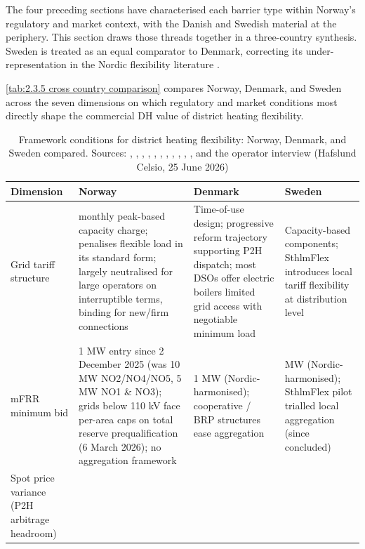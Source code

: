 The four preceding sections have characterised each barrier type within Norway's regulatory and market context, with the Danish and Swedish material at the periphery. This section draws those threads together in a three-country synthesis. Sweden is treated as an equal comparator to Denmark, correcting its under-representation in the Nordic flexibility literature \cite{atabaki_optimising_2026, fernqvist_district_2023}.

\autoref{tab:2.3.5 cross country comparison} compares Norway, Denmark, and Sweden across the seven dimensions on which regulatory and market conditions most directly shape the commercial DH value of district heating flexibility.

\begin{table}[!ht]
\centering
\caption{Framework conditions for district heating flexibility:
Norway, Denmark, and Sweden compared. Sources: \cite{sandberg_framework_2018}, \cite{sneum_economic_2018}, \cite{kirkerud_impacts_2016}, \cite{johansen_something_2022}, \cite{fernqvist_district_2023}, \cite{atabaki_optimising_2026}, \cite{levihn_chp_2017}, \cite{sandberg_energy_2019}, \cite{skytte_flexible_2019}, \cite{Thema_fjernvarme_2024}, \cite{statnett_innforing_2026}, and the operator interview (Hafslund Celsio, 25 June 2026)}
\small
\begin{tabular}{>{\raggedright}p{3.2cm}
                >{\raggedright}p{3.5cm}
                >{\raggedright}p{3.5cm}
                >{\raggedright\arraybackslash}p{3.5cm}}
\toprule
\textbf{Dimension} &
\textbf{Norway} &
\textbf{Denmark} &
\textbf{Sweden} \\
\midrule
Grid tariff structure &
monthly peak-based capacity charge; penalises flexible load in its standard form; largely neutralised for large operators on interruptible terms, binding for new/firm connections &
Time-of-use design; progressive reform trajectory supporting P2H dispatch; most DSOs offer electric boilers limited grid access with negotiable minimum load &
Capacity-based components; SthlmFlex introduces local tariff flexibility at distribution level \\[4pt]
mFRR minimum bid &
1 MW entry since 2 December 2025 (was 10 MW NO2/NO4/NO5, 5 MW NO1 \& NO3); grids below 110 kV face per-area caps on total reserve prequalification (6 March 2026); no aggregation framework &
1 MW (Nordic-harmonised); cooperative / BRP structures ease aggregation &
1 MW (Nordic-harmonised); SthlmFlex pilot trialled local aggregation (since concluded) \\[4pt]
Spot price variance (P2H arbitrage headroom) &

\end{tabular}
\end{table}
